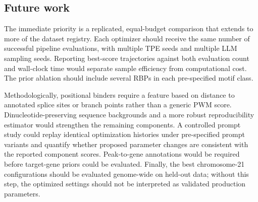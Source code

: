 \subsection{Future work}

The immediate priority is a replicated, equal-budget comparison that extends to
more of the dataset registry. Each optimizer should receive the same number of successful
pipeline evaluations, with multiple TPE seeds and multiple LLM sampling seeds.
Reporting best-score trajectories against both evaluation count and wall-clock
time would separate sample efficiency from computational cost. The prior ablation
should include several RBPs in each pre-specified motif class.

Methodologically, positional binders require a feature based on distance to
annotated splice sites or branch points rather than a generic PWM score.
Dinucleotide-preserving sequence backgrounds and a more robust reproducibility
estimator would strengthen the remaining components. A controlled prompt study
could replay identical optimization histories under pre-specified prompt
variants and quantify whether proposed parameter changes are consistent with the
reported component scores. Peak-to-gene annotations would be required before
target-gene priors could be evaluated. Finally, the best chromosome-21
configurations should be evaluated genome-wide on held-out data;
without this step, the optimized settings should not be interpreted as validated
production parameters.
